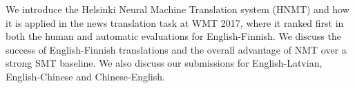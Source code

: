 We introduce the Helsinki Neural Machine Translation system (HNMT) and how it is applied in the news translation task at WMT 2017, where it ranked first in both the human and automatic evaluations for English-Finnish.  We discuss the success of English-Finnish translations and the overall advantage of NMT over a strong SMT baseline. We also discuss our submissions for English-Latvian, English-Chinese and Chinese-English.
